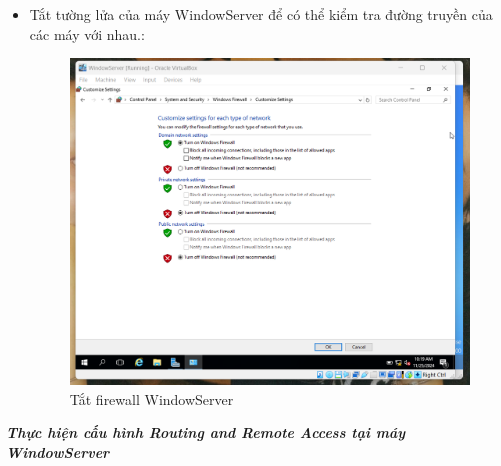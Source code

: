   \begin{itemize}
   \item Tắt tường lửa của máy WindowServer để có thể kiểm tra đường truyền của các máy với nhau.:
   
        \begin{figure}[htbp]
        \centering
        \includegraphics[width=0.6\linewidth]{RemoteAccessVPNimg/Firewall_SV.png}
        \caption{Tắt firewall WindowServer}
        \end{figure}
        
  \end{itemize}

\newpage
 \textbf{\textit{Thực hiện cấu hình Routing and Remote Access tại máy WindowServer}}

